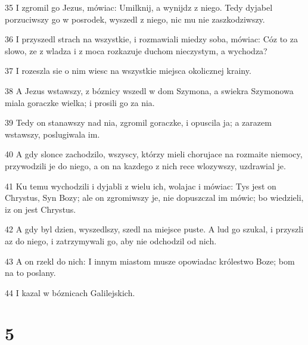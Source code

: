 \par 35 I zgromil go Jezus, mówiac: Umilknij, a wynijdz z niego. Tedy dyjabel porzuciwszy go w posrodek, wyszedl z niego, nic mu nie zaszkodziwszy.
\par 36 I przyszedl strach na wszystkie, i rozmawiali miedzy soba, mówiac: Cóz to za slowo, ze z wladza i z moca rozkazuje duchom nieczystym, a wychodza?
\par 37 I rozeszla sie o nim wiesc na wszystkie miejsca okolicznej krainy.
\par 38 A Jezus wstawszy, z bóznicy wszedl w dom Szymona, a swiekra Szymonowa miala goraczke wielka; i prosili go za nia.
\par 39 Tedy on stanawszy nad nia, zgromil goraczke, i opuscila ja; a zarazem wstawszy, poslugiwala im.
\par 40 A gdy slonce zachodzilo, wszyscy, którzy mieli chorujace na rozmaite niemocy, przywodzili je do niego, a on na kazdego z nich rece wlozywszy, uzdrawial je.
\par 41 Ku temu wychodzili i dyjabli z wielu ich, wolajac i mówiac: Tys jest on Chrystus, Syn Bozy; ale on zgromiwszy je, nie dopuszczal im mówic; bo wiedzieli, iz on jest Chrystus.
\par 42 A gdy byl dzien, wyszedlszy, szedl na miejsce puste. A lud go szukal, i przyszli az do niego, i zatrzymywali go, aby nie odchodzil od nich.
\par 43 A on rzekl do nich: I innym miastom musze opowiadac królestwo Boze; bom na to poslany.
\par 44 I kazal w bóznicach Galilejskich.

\chapter{5}

